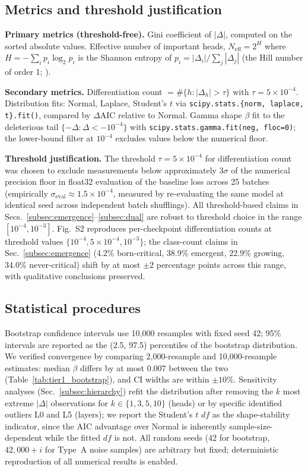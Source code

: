 \documentclass{article}
\begin{document}
\subsection{Metrics and threshold justification}

\textbf{Primary metrics (threshold-free).} Gini coefficient of $|\Delta|$, computed on the sorted absolute values. Effective number of important heads, $N_\text{eff} = 2^H$ where $H = -\sum_i p_i \log_2 p_i$ is the Shannon entropy of $p_i = |\Delta_i| / \sum_j |\Delta_j|$ (the Hill number of order 1; \citealp{hill1973diversity, jost2006entropy}).

\textbf{Secondary metrics.} Differentiation count $= \#\{h : |\Delta_h| > \tau\}$ with $\tau = 5 \times 10^{-4}$. Distribution fits: Normal, Laplace, Student's $t$ via \texttt{scipy.stats.\{norm, laplace, t\}.fit()}, compared by $\Delta\text{AIC}$ relative to Normal. Gamma shape $\beta$ fit to the deleterious tail $\{-\Delta : \Delta < -10^{-4}\}$ with \texttt{scipy.stats.gamma.fit(neg, floc=0)}; the lower-bound filter at $10^{-4}$ excludes values below the numerical floor.

\textbf{Threshold justification.} The threshold $\tau = 5 \times 10^{-4}$ for differentiation count was chosen to exclude measurements below approximately $3\sigma$ of the numerical precision floor in float32 evaluation of the baseline loss across 25 batches (empirically $\sigma_\text{eval} \approx 1.5 \times 10^{-4}$, measured by re-evaluating the same model at identical seed across independent batch shufflings). All threshold-based claims in Secs.~\ref{subsec:emergence}--\ref{subsec:dual} are robust to threshold choice in the range $[10^{-4}, 10^{-3}]$. Fig.~S2 reproduces per-checkpoint differentiation counts at threshold values $\{10^{-4}, 5 \times 10^{-4}, 10^{-3}\}$; the class-count claims in Sec.~\ref{subsec:emergence} (4.2\% born-critical, 38.9\% emergent, 22.9\% growing, 34.0\% never-critical) shift by at most $\pm 2$ percentage points across this range, with qualitative conclusions preserved.

\subsection{Statistical procedures}

Bootstrap confidence intervals use 10{,}000 resamples with fixed seed 42; 95\% intervals are reported as the (2.5, 97.5) percentiles of the bootstrap distribution. We verified convergence by comparing 2{,}000-resample and 10{,}000-resample estimates: median $\beta$ differs by at most $0.007$ between the two (Table~\ref{tab:tier1_bootstrap}), and CI widths are within $\pm 10\%$. Sensitivity analyses (Sec.~\ref{subsec:hierarchy}) refit the distribution after removing the $k$ most extreme $|\Delta|$ observations for $k \in \{1, 3, 5, 10\}$ (heads) or by specific identified outliers L0 and L5 (layers); we report the Student's $t$ $df$ as the shape-stability indicator, since the AIC advantage over Normal is inherently sample-size-dependent while the fitted $df$ is not. All random seeds (42 for bootstrap, $42{,}000 + i$ for Type~A noise samples) are arbitrary but fixed; deterministic reproduction of all numerical results is enabled.
\end{document}
